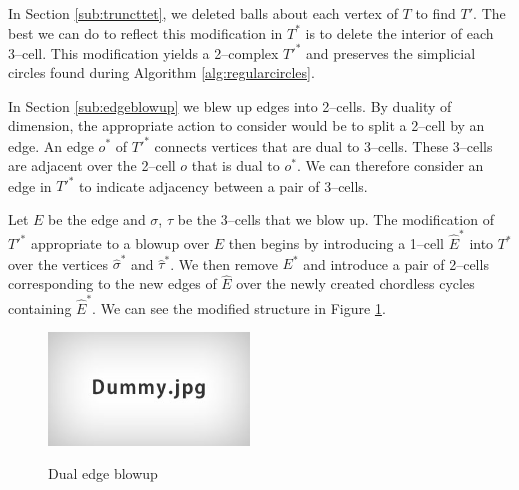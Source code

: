 In Section \ref{sub:truncttet}, we deleted balls about each vertex of $T$ to find $T'$.
The best we can do to reflect this modification in $T^*$ is to delete the interior of each 3--cell.
This modification yields a 2--complex $T'^*$ and preserves the simplicial circles found during Algorithm \ref{alg:regularcircles}.

In Section \ref{sub:edgeblowup} we blew up edges into 2--cells.
By duality of dimension, the appropriate action to consider would be to split a 2--cell by an edge.
An edge $o^*$ of $T'^*$ connects vertices that are dual to 3--cells.
These 3--cells are adjacent over the 2--cell $o$ that is dual to $o^*$.
We can therefore consider an edge in $T'^*$ to indicate adjacency between a pair of 3--cells.

Let $E$ be the edge and $\sigma$, $\tau$ be the 3--cells that we blow up.
The modification of $T'^*$ appropriate to a blowup over $E$ then begins by introducing a 1--cell $\hat{E}^*$ into $T^*$ over the vertices $\hat{\sigma}^*$ and $\hat{\tau}^*$.
We then remove $E^*$ and introduce a pair of 2--cells corresponding to the new edges of $\hat{E}$ over the newly created chordless cycles containing $\hat{E}^*$.
We can see the modified structure in Figure \ref{fig:dualblowup}.

\begin{figure}
	\centering
	\captionsetup{justification=centering}
	\caption{Dual edge blowup}
	\includegraphics[height=3cm]{figures/dummy.jpg}
	\label{fig:dualblowup}
\end{figure}
